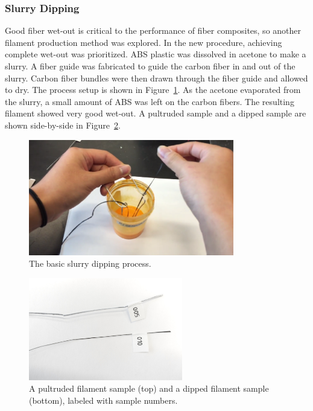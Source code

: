 \clearpage

\subsubsection{Slurry Dipping}

\indent

Good fiber wet-out is critical to the performance of fiber composites, so another filament production method was explored. In the new procedure, achieving complete wet-out was prioritized. ABS plastic was dissolved in acetone to make a slurry. A fiber guide was fabricated to guide the carbon fiber in and out of the slurry. Carbon fiber bundles were then drawn through the fiber guide and allowed to dry. The process setup is shown in Figure~\ref{fig:dipping-vid}. As the acetone evaporated from the slurry, a small amount of ABS was left on the carbon fibers. The resulting filament showed very good wet-out. A pultruded sample and a dipped sample are shown side-by-side in Figure~\ref{fig:two-samples}.\\

\begin{figure}[h!]
    \centering
    \includegraphics[width=0.8\textwidth]{./figures/dipping-vid}
    \caption{The basic slurry dipping process.}
    \label{fig:dipping-vid}
\end{figure}

\begin{figure}[h!]
    \centering
    \includegraphics[width=0.6\textwidth]{./figures/FilamentSample}
    \caption{A pultruded filament sample (top) and a dipped filament sample (bottom), labeled with sample numbers.}
    \label{fig:two-samples}
\end{figure}

